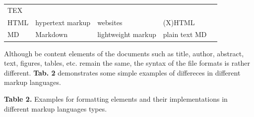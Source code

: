 \documentclass[10pt,fleqn]{wlpeerj}
\begin{document}
\begin{longtable}[]{@{}lllll@{}}
\begin{minipage}[t]{0.10\columnwidth}
TEX
\strut\end{minipage}
&
\begin{minipage}[t]{0.41\columnwidth}\raggedright\strut
\citep{lamport_latex:_1994}
\strut\end{minipage}\tabularnewline
\begin{minipage}[t]{0.06\columnwidth}\raggedright\strut
HTML
\strut\end{minipage}
&
\begin{minipage}[t]{0.15\columnwidth}\raggedright\strut
hypertext
markup
\strut\end{minipage}
&
\begin{minipage}[t]{0.13\columnwidth}\raggedright\strut
websites
\strut\end{minipage}
&
\begin{minipage}[t]{0.10\columnwidth}\raggedright\strut
(X)HTML
\strut\end{minipage}
&
\begin{minipage}[t]{0.41\columnwidth}\raggedright\strut
\citep{HTML4, HTML5}
\strut\end{minipage}\tabularnewline
\begin{minipage}[t]{0.06\columnwidth}\raggedright\strut
MD
\strut\end{minipage}
&
\begin{minipage}[t]{0.15\columnwidth}\raggedright\strut
Markdown
\strut\end{minipage}
&
\begin{minipage}[t]{0.13\columnwidth}\raggedright\strut
lightweight
markup
\strut\end{minipage}
&
\begin{minipage}[t]{0.10\columnwidth}\raggedright\strut
plain
text
MD
\strut\end{minipage}
&
\begin{minipage}[t]{0.41\columnwidth}\raggedright\strut
\citep{ovadia_markdown_2014, rfc7764}
\strut\end{minipage}\tabularnewline
\bottomrule
\end{longtable}

Although
be
content
elements
of
the
documents
such
as
title,
author,
abstract,
text,
figures,
tables,
etc.
remain
the
same,
the
syntax
of
the
file
formats
is
rather
different.
\textbf{Tab.
2}
demonstrates
some
simple
examples
of
differeces
in
different
markup
languages.

\textbf{Table
2.}
Examples
for
formatting
elements
and
their
implementations
in
different
markup
languages
types.
\end{document}
